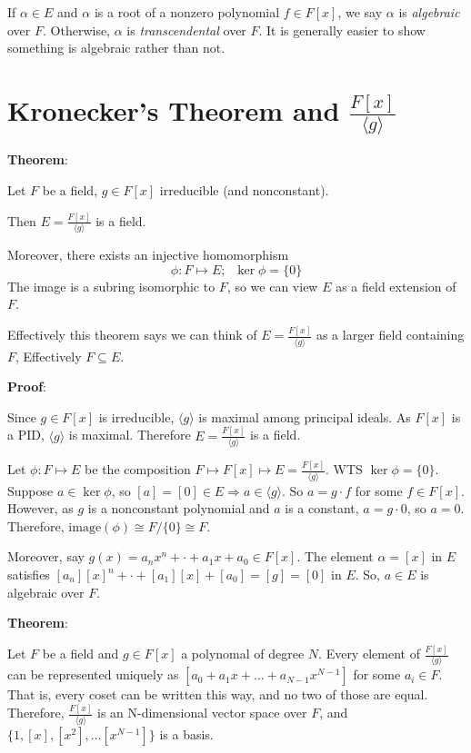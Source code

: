 \documentclass{article}
\begin{document}
\begin{multicols*}{2}
If $\alpha \in E$ and $\alpha$ is a root of a nonzero polynomial $f \in F[x]$, we say $\alpha$ is \textit{algebraic} over $F$. Otherwise, $\alpha$ is \textit{transcendental} over $F$. It is generally easier to show something is algebraic rather than not.

\section{Kronecker's Theorem and $\frac{F[x]}{\langle g \rangle}$}

\textbf{Theorem}:

Let $F$ be a field, $g \in F[x]$ irreducible (and nonconstant).

Then $E = \frac{F[x]}{\langle g \rangle}$ is a field.

Moreover, there exists an injective homomorphism\[\phi: F \mapsto E; \;\;\ker\phi = \{0\}\] The image is a subring isomorphic to $F$, so we can view $E$ as a field extension of $F$.

Effectively this theorem says we can think of $E = \frac{F[x]}{\langle g \rangle}$ as a larger field containing $F$, Effectively $F \subseteq E$.

\textbf{Proof}:

Since $g \in F[x]$ is irreducible, $\langle g\rangle$ is maximal among principal ideals. As $F[x]$ is a PID, $\langle g\rangle$ is maximal. Therefore $E = \frac{F[x]}{\langle g \rangle}$ is a field.

Let $\phi : F \mapsto E$ be the composition $F \mapsto F[x] \mapsto E = \frac{F[x]}{\langle g \rangle}$. WTS $\ker\phi = \{0\}$. Suppose $a \in \ker \phi$, so $[a] = [0] \in E \Rightarrow a \in \langle g \rangle$. So $a = g \cdot f$ for some $f \in F[x]$. However, as $g$ is a nonconstant polynomial and $a$ is a constant, $a=g \cdot 0$, so $a = 0$. Therefore, $\text{image}(\phi) \cong F/\{0\} \cong F$.

Moreover, say  $g(x) = a_nx^n + \cdot + a_1x + a_0 \in F[x]$. The element $\alpha = [x]$ in $E$ satisfies $[a_n][x]^n + \cdot + [a_1][x] + [a_0] = [g] = [0]$ in $E$. So, $a \in E$ is algebraic over $F$.

\textbf{Theorem}:

Let $F$ be a field and $g \in F[x]$ a polynomal of degree $N$. Every element of $\frac{F[x]}{\langle g \rangle}$ can be represented uniquely as $[a_0+a_1x+\dots+a_{N-1}x^{N-1}]$ for some $a_i \in F$. That is, every coset can be written this way, and no two of those are equal. Therefore, $\frac{F[x]}{\langle g \rangle}$ is an N-dimensional vector space over $F$, and $\{1,[x],[x^2],\dots[x^{N-1}]\}$ is a basis.


\end{multicols*}
\end{document}
